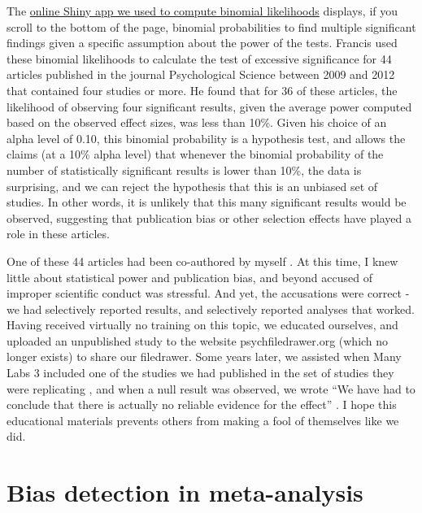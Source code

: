\documentclass[
  oneside]{book}
\begin{document}
The \href{http://shiny.ieis.tue.nl/mixed_results_likelihood/}{online Shiny app we used to compute binomial likelihoods} displays, if you scroll to the bottom of the page, binomial probabilities to find multiple significant findings given a specific assumption about the power of the tests. Francis \citep{francis_frequency_2014} used these binomial likelihoods to calculate the test of excessive significance \citep{ioannidis_exploratory_2007} for 44 articles published in the journal Psychological Science between 2009 and 2012 that contained four studies or more. He found that for 36 of these articles, the likelihood of observing four significant results, given the average power computed based on the observed effect sizes, was less than 10\%. Given his choice of an alpha level of 0.10, this binomial probability is a hypothesis test, and allows the claims (at a 10\% alpha level) that whenever the binomial probability of the number of statistically significant results is lower than 10\%, the data is surprising, and we can reject the hypothesis that this is an unbiased set of studies. In other words, it is unlikely that this many significant results would be observed, suggesting that publication bias or other selection effects have played a role in these articles.

One of these 44 articles had been co-authored by myself \citep{jostmann_weight_2009}. At this time, I knew little about statistical power and publication bias, and beyond accused of improper scientific conduct was stressful. And yet, the accusations were correct - we had selectively reported results, and selectively reported analyses that worked. Having received virtually no training on this topic, we educated ourselves, and uploaded an unpublished study to the website psychfiledrawer.org (which no longer exists) to share our filedrawer. Some years later, we assisted when Many Labs 3 included one of the studies we had published in the set of studies they were replicating \citep{ebersole_many_2016}, and when a null result was observed, we wrote ``We have had to conclude that there is actually no reliable evidence for the effect'' \citep{jostmann_short_2016}. I hope this educational materials prevents others from making a fool of themselves like we did.

\hypertarget{bias-detection-in-meta-analysis}{%
\section{Bias detection in meta-analysis}\label{bias-detection-in-meta-analysis}}
\end{document}
